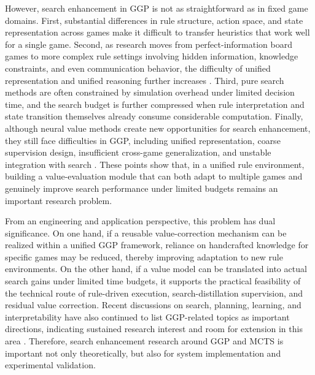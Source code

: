 However, search enhancement in GGP is not as straightforward as in fixed game domains. First, substantial differences in rule structure, action space, and state representation across games make it difficult to transfer heuristics that work well for a single game. Second, as research moves from perfect-information board games to more complex rule settings involving hidden information, knowledge constraints, and even communication behavior, the difficulty of unified representation and unified reasoning further increases \cite{partridge2022hidden,zammit2023communication}. Third, pure search methods are often constrained by simulation overhead under limited decision time, and the search budget is further compressed when rule interpretation and state transition themselves already consume considerable computation. Finally, although neural value methods create new opportunities for search enhancement, they still face difficulties in GGP, including unified representation, coarse supervision design, insufficient cross-game generalization, and unstable integration with search \cite{goldwaser2020deep,mcewan2022knowledge,maras2024fast}. These points show that, in a unified rule environment, building a value-evaluation module that can both adapt to multiple games and genuinely improve search performance under limited budgets remains an important research problem.


From an engineering and application perspective, this problem has dual significance. On one hand, if a reusable value-correction mechanism can be realized within a unified GGP framework, reliance on handcrafted knowledge for specific games may be reduced, thereby improving adaptation to new rule environments. On the other hand, if a value model can be translated into actual search gains under limited time budgets, it supports the practical feasibility of the technical route of rule-driven execution, search-distillation supervision, and residual value correction. Recent discussions on search, planning, learning, and interpretability have also continued to list GGP-related topics as important directions, indicating sustained research interest and room for extension in this area \cite{soemers2024gametable}. Therefore, search enhancement research around GGP and MCTS is important not only theoretically, but also for system implementation and experimental validation.

